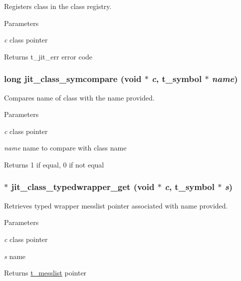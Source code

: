 Registers class in the class registry. 
\begin{DoxyParams}{Parameters}
\item[{\em c}]class pointer\end{DoxyParams}
\begin{DoxyReturn}{Returns}
t\_\-jit\_\-err error code 
\end{DoxyReturn}
\hypertarget{group__classmod_gaeca58f03626ad49dfc7997f979ce602f}{
\subsubsection[{jit\_\-class\_\-symcompare}]{\setlength{\rightskip}{0pt plus 5cm}long jit\_\-class\_\-symcompare (void $\ast$ {\em c}, \/  {\bf t\_\-symbol} $\ast$ {\em name})}}
\label{group__classmod_gaeca58f03626ad49dfc7997f979ce602f}


Compares name of class with the name provided. 
\begin{DoxyParams}{Parameters}
\item[{\em c}]class pointer \item[{\em name}]name to compare with class name\end{DoxyParams}
\begin{DoxyReturn}{Returns}
1 if equal, 0 if not equal 
\end{DoxyReturn}
\hypertarget{group__classmod_ga0486ba2dc02d1ff1358f0401956d3080}{
\subsubsection[{jit\_\-class\_\-typedwrapper\_\-get}]{$\ast$ jit\_\-class\_\-typedwrapper\_\-get (void $\ast$ {\em c}, \/  {\bf t\_\-symbol} $\ast$ {\em s})}}
\label{group__classmod_ga0486ba2dc02d1ff1358f0401956d3080}


Retrieves typed wrapper messlist pointer associated with name provided. 
\begin{DoxyParams}{Parameters}
\item[{\em c}]class pointer \item[{\em s}]name\end{DoxyParams}
\begin{DoxyReturn}{Returns}
\hyperlink{structt__messlist}{t\_\-messlist} pointer 
\end{DoxyReturn}
